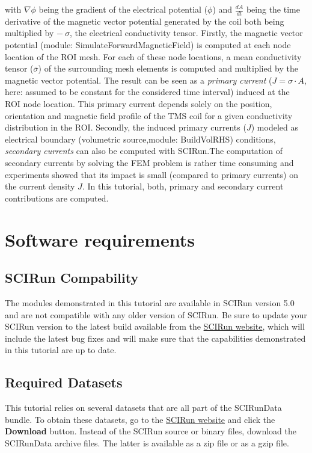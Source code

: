 \documentclass[fleqn,11pt,openany]{book}
\begin{document}
with $\nabla{\phi}$ being the gradient of the electrical potential ($\phi$) and $\frac{dA}{dt}$ being the time derivative of the magnetic vector potential generated by the coil both being multiplied
by $-\ \sigma$, the electrical conductivity tensor. Firstly, the magnetic vector potential (module: SimulateForwardMagneticField) is computed at each node location of the ROI mesh. For each of these node locations, a mean conductivity tensor ($\bar{\sigma}$) of the surrounding
mesh elements is computed and multiplied by the magnetic vector potential.
The result can be seen as a \textit{primary current} ($J = \sigma \cdot A$, here: assumed to be constant for the considered time interval) induced at the ROI node location.
This primary current depends solely on the position, orientation and magnetic field profile of the TMS coil for a given conductivity distribution in the ROI.
Secondly, the induced primary currents ($J$) modeled as electrical boundary (volumetric source,module: BuildVolRHS) conditions, \textit{secondary currents} can also be computed with SCIRun.The
computation of secondary currents by solving the FEM problem is rather time consuming and experiments showed that its impact is small (compared to primary currents) on the current density $J$. 
In this tutorial, both, primary and secondary current contributions are computed.

\chapter{Software requirements}

\section*{SCIRun Compability} 

The modules demonstrated in this tutorial are available in SCIRun version 5.0 and are not compatible with any older version of SCIRun.
Be sure to update your SCIRun version to the latest build available from the \href{http://www.scirun.org}{SCIRun website}, which will include the latest bug fixes and will make sure that the capabilities demonstrated in this tutorial are up to date.

\section*{Required Datasets} 

This tutorial relies on several datasets that are all part of the SCIRunData bundle.
To obtain these datasets, go to the \href{http://www.scirun.org}{SCIRun website} and click the \textbf{Download} button.
Instead of the SCIRun source or binary files, download the SCIRunData archive files.
The latter is available as a zip file or as a gzip file. 
\end{document}
